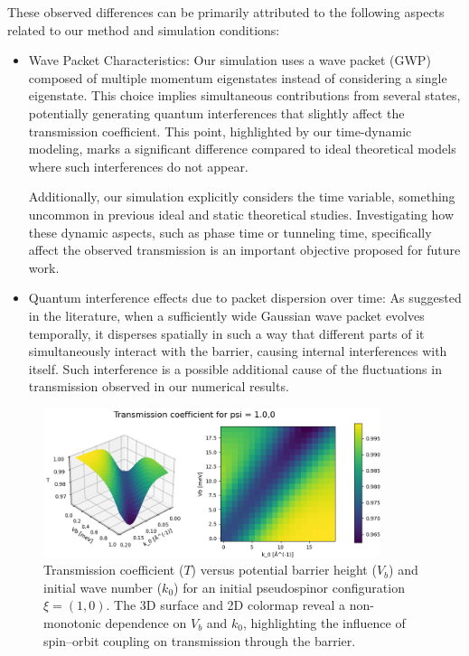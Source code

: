 These observed differences can be primarily attributed to the following aspects related to our method and simulation conditions:

\begin{itemize}
    \item Wave Packet Characteristics:
    Our simulation uses a wave packet (GWP) composed of multiple momentum eigenstates instead of considering a single eigenstate.
    This choice implies simultaneous contributions from several states, potentially generating quantum interferences that slightly affect the transmission coefficient\cite{Staelens2021}.
    This point, highlighted by our time-dynamic modeling, marks a significant difference compared to ideal theoretical models where such interferences do not appear.

    Additionally, our simulation explicitly considers the time variable, something uncommon in previous ideal and static theoretical studies.
    Investigating how these dynamic aspects, such as phase time or tunneling time, specifically affect the observed transmission is an important objective proposed for future work.

    \item Quantum interference effects due to packet dispersion over time:
    As suggested in the literature\cite{MolgadoMex2018}, when a sufficiently wide Gaussian wave packet evolves temporally, it disperses spatially in such a way that different parts of it simultaneously interact with the barrier, causing internal interferences with itself.
    Such interference is a possible additional cause of the fluctuations in transmission observed in our numerical results.
\end{itemize}
    
\begin{figure}%
        \centering
        \includegraphics[width=0.88\textwidth]{../assets/images/Rashba/TCoefficient(1.0,0)xalpha=0.2beta=-0.2}
        \caption{Transmission coefficient ($T$) versus potential barrier height ($V_b$) and initial wave number ($k_0$) for an initial pseudospinor configuration $\xi = (1, 0)$. The 3D surface and 2D colormap reveal a non-monotonic dependence on $V_b$ and $k_0$, highlighting the influence of spin–orbit coupling on transmission through the barrier.}
        \label{fig:rashba}
\end{figure}


